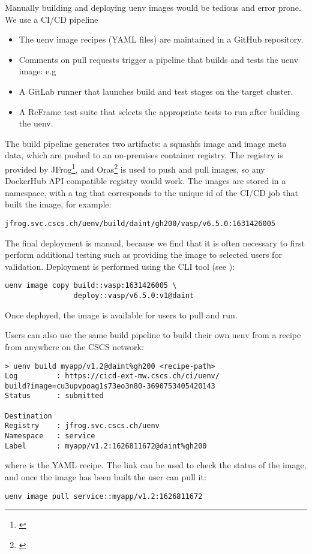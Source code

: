 Manually building and deploying uenv images would be tedious and error prone.
We use a CI/CD pipeline 
\begin{itemize}
    \item The uenv image recipes (YAML files) are maintained in a GitHub repository.
    \item Comments on pull requests trigger a pipeline that builds and tests the uenv image: e.g 
    \item A GitLab runner that launches build and test stages on the target cluster.
    \item A ReFrame test suite that selects the appropriate tests to run after building the uenv.
\end{itemize}


The build pipeline generates two artifacts: a squashfs image and image meta data, which are pushed to an on-premises container registry.
The registry is provided by JFrog\footnote{\href{https://jfrog.com}{}}, and Oras\footnote{\href{https://oras.land}{}} is used to push and pull images, so any DockerHub API compatible registry would work.
The images are stored in a  namespace, with a tag that corresponds to the unique id of the CI/CD job that built the image, for example:
\begin{lstlisting}
jfrog.svc.cscs.ch/uenv/build/daint/gh200/vasp/v6.5.0:1631426005
\end{lstlisting}

The final deployment is manual, because we find that it is often necessary to first perform additional testing such as providing the image to selected users for validation.
Deployment is performed using the CLI tool (see ):
\begin{lstlisting}
uenv image copy build::vasp:1631426005 \
                deploy::vasp/v6.5.0:v1@daint
\end{lstlisting}
Once deployed, the image is available for users to pull and run.

Users can also use the same build pipeline to build their own uenv from a recipe from anywhere on the CSCS network:
\begin{lstlisting}
> uenv build myapp/v1.2@daint%gh200 <recipe-path>
Log         : https://cicd-ext-mw.cscs.ch/ci/uenv/
build?image=cu3upvpoag1s73eo3n80-3690753405420143
Status      : submitted

Destination
Registry    : jfrog.svc.cscs.ch/uenv
Namespace   : service
Label       : myapp/v1.2:1626811672@daint%gh200
\end{lstlisting}
where  is the YAML recipe.
The link can be used to check the status of the image, and once the image has been built the user can pull it:
\begin{lstlisting}
uenv image pull service::myapp/v1.2:1626811672
\end{lstlisting}

